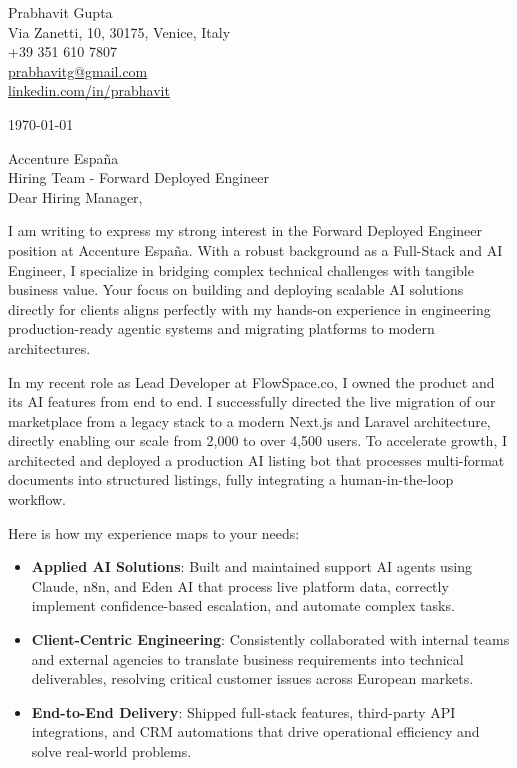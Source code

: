 \documentclass[11pt,a4paper]{article}
\begin{document}
\thispagestyle{empty}

\begin{flushright}
Prabhavit Gupta\\
Via Zanetti, 10, 30175, Venice, Italy\\
+39 351 610 7807\\
\href{mailto:prabhavitg@gmail.com}{prabhavitg@gmail.com}\\
\href{https://www.linkedin.com/in/prabhavit/}{linkedin.com/in/prabhavit}
\end{flushright}

\vspace{2em}
\noindent \today

\vspace{1em}
\noindent
Accenture Espa\~na\\
Hiring Team - Forward Deployed Engineer\\

\vspace{1em}
\noindent Dear Hiring Manager,

\vspace{1em}
\noindent
I am writing to express my strong interest in the Forward Deployed Engineer position at Accenture Espa\~na. With a robust background as a Full-Stack and AI Engineer, I specialize in bridging complex technical challenges with tangible business value. Your focus on building and deploying scalable AI solutions directly for clients aligns perfectly with my hands-on experience in engineering production-ready agentic systems and migrating platforms to modern architectures.

\vspace{1em}
\noindent
In my recent role as Lead Developer at FlowSpace.co, I owned the product and its AI features from end to end. I successfully directed the live migration of our marketplace from a legacy stack to a modern Next.js and Laravel architecture, directly enabling our scale from 2,000 to over 4,500 users. To accelerate growth, I architected and deployed a production AI listing bot that processes multi-format documents into structured listings, fully integrating a human-in-the-loop workflow. 

\vspace{1em}
\noindent
Here is how my experience maps to your needs:
\begin{itemize}
    \item \textbf{Applied AI Solutions}: Built and maintained support AI agents using Claude, n8n, and Eden AI that process live platform data, correctly implement confidence-based escalation, and automate complex tasks.
    \item \textbf{Client-Centric Engineering}: Consistently collaborated with internal teams and external agencies to translate business requirements into technical deliverables, resolving critical customer issues across European markets.
    \item \textbf{End-to-End Delivery}: Shipped full-stack features, third-party API integrations, and CRM automations that drive operational efficiency and solve real-world problems.
\end{itemize}
\end{document}
